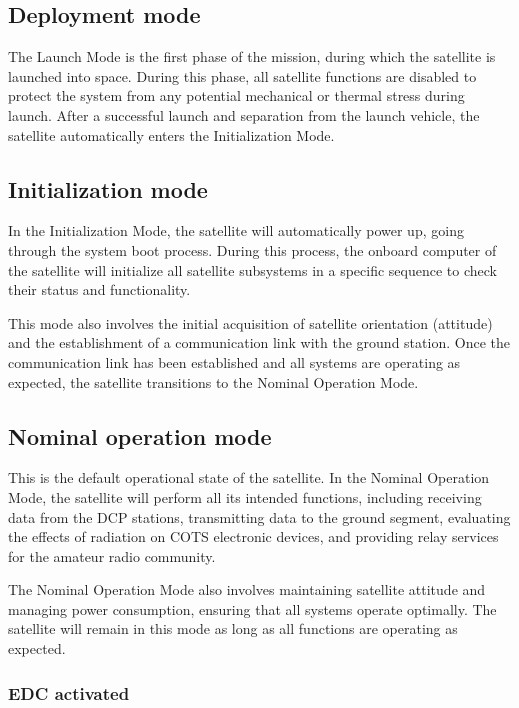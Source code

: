 \subsection{Deployment mode}

The Launch Mode is the first phase of the mission, during which the satellite is launched into space. During this phase, all satellite functions are disabled to protect the system from any potential mechanical or thermal stress during launch. After a successful launch and separation from the launch vehicle, the satellite automatically enters the Initialization Mode.

\subsection{Initialization mode}

In the Initialization Mode, the satellite will automatically power up, going through the system boot process. During this process, the onboard computer of the satellite will initialize all satellite subsystems in a specific sequence to check their status and functionality.

This mode also involves the initial acquisition of satellite orientation (attitude) and the establishment of a communication link with the ground station. Once the communication link has been established and all systems are operating as expected, the satellite transitions to the Nominal Operation Mode.

\subsection{Nominal operation mode}

This is the default operational state of the satellite. In the Nominal Operation Mode, the satellite will perform all its intended functions, including receiving data from the DCP stations, transmitting data to the ground segment, evaluating the effects of radiation on COTS electronic devices, and providing relay services for the amateur radio community.

The Nominal Operation Mode also involves maintaining satellite attitude and managing power consumption, ensuring that all systems operate optimally. The satellite will remain in this mode as long as all functions are operating as expected.

\subsubsection{EDC activated}

